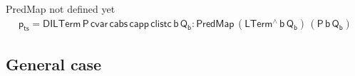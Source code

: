\documentclass[acmsmall,screen,review,anonymous]{acmart}
\theoremstyle{definition}
\begin{document}
{\color{red} PredMap not defined yet} 
\begin{multline*}
  \mathsf{
  p_{ts} = DILTerm\, P\, cvar\, cabs\, capp\, clistc\, b\, Q_b :  PredMap \,(LTerm^{\wedge}\, b\, Q_b) \, (P\,b\,Q_b)
  }
\end{multline*}




\subsection{General case}

\end{document}
